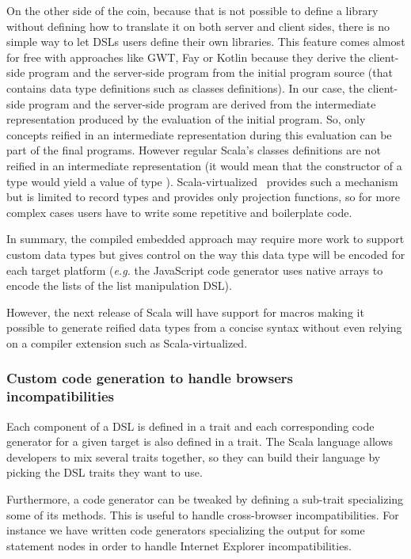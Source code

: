 \documentclass[american,english,runningheads]{llncs}
\newcommand{\eg}{\emph{e.g.}}
\begin{document}
On the other side of the coin, because that is not possible to define a library without defining how to translate it
on both server and client sides, there is no simple way to let DSLs users define their own libraries. This feature
comes almost for free with approaches like GWT, Fay or Kotlin because they derive the client-side program and the
server-side program from the initial program source (that contains data type definitions such as classes
definitions). In our case, the client-side program and the server-side program are derived from the intermediate
representation produced by the evaluation of the initial program. So, only concepts reified in an intermediate
representation during this evaluation can be part of the final programs. However regular Scala’s classes definitions
are not reified in an intermediate representation (it would mean that the constructor of a type  would yield
a value of type ). Scala-virtualized~\cite{Moors12_Virtualized} provides such a mechanism but is 
limited to record types and provides only projection functions, so for more complex cases users have to write some
repetitive and boilerplate code.

In summary, the compiled embedded approach may require more work to support custom data types but gives control on
the way this data type will be encoded for each target platform (\eg{} the JavaScript code generator uses native
arrays to encode the lists of the list manipulation DSL).

However, the next release of Scala will have support for macros making it possible to generate reified data types
from a concise syntax without even relying on a compiler extension such as Scala-virtualized.

\subsubsection{Custom code generation to handle browsers incompatibilities}

Each component of a DSL is defined in a trait and each corresponding code generator for a given target is also
defined in a trait. The Scala language allows developers to mix several traits together, so they can build their
language by picking the DSL traits they want to use.

Furthermore, a code generator can be tweaked by defining a sub-trait specializing some of its methods. This is useful
to handle cross-browser incompatibilities. For instance we have written code generators specializing the output for
some statement nodes in order to handle Internet Explorer incompatibilities.
\end{document}
